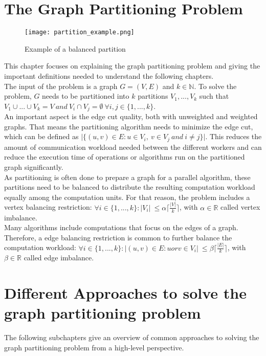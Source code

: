 \documentclass[acmsmall,nonacm,screen,review]{acmart}
\begin{document}
\section{The Graph Partitioning Problem}
\begin{figure}[t]
\centering
\caption{Example of a balanced partition}
\label{partition}
\texttt{[image: partition\_example.png]}
\end{figure}
This chapter focuses on explaining the graph partitioning problem and giving the important definitions needed to understand the following chapters. \\
The input of the problem is a graph $G = (V,E)$ and $k\in \mathbb{N}$. To solve the problem, $G$ needs to be partitioned into $k$ partitions $V_{1},...,V_{k}$ such that $V_{1}\cup...\cup V_{k} = V\ and\ V_{i}\cap V_{j} = \emptyset\ \forall i,j\in \{1,...,k\}$.\\
An important aspect is the edge cut quality, both with unweighted and weighted graphs. That means the partitioning algorithm needs to minimize the edge cut, which can be defined as $\vert \{(u,v)\in E : u\in V_{i},\ v\in V_{j}\ and\ i\neq j \}\vert$. This reduces the amount of communication workload needed between the different workers and can reduce the execution time of operations or algorithms run on the partitioned graph significantly. \\
As partitioning is often done to prepare a graph for a parallel algorithm, these partitions need to be balanced to distribute the resulting computation workload equally among the computation units. For that reason, the problem includes a vertex balancing restriction: $\forall i\in \{1,...,k\} : \vert V_{i}\vert \ \leq \alpha \lceil \frac{\vert V \vert }{k} \rceil $, with $\alpha \in \mathbb{R}$ called vertex imbalance. \\
Many algorithms include computations that focus on the edges of a graph. Therefore, a edge balancing restriction is common to further balance the computation workload: $\forall i\in \{1,...,k\} : \vert (u,v)\in E : u or v \in V_{i} \vert \ \leq \beta \lceil \frac{\vert E \vert }{k} \rceil $, with $\beta \in \mathbb{R}$ called edge imbalance.
\section{Different Approaches to solve the graph partitioning problem}
The following subchapters give an overview of common approaches to solving the graph partitioning problem from a high-level perspective.
\end{document}
